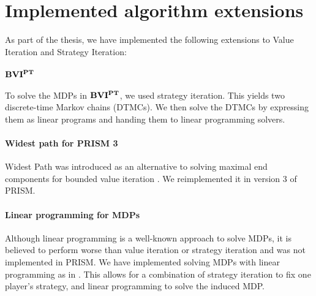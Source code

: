 \chapter{Implemented algorithm extensions} \label{ch:implementedAlgos}
As part of the thesis, we have implemented the following extensions to Value Iteration and Strategy Iteration:

\subsubsection*{$\mathbf{BVI^{PT}}$} To solve the MDPs in $\mathbf{BVI^{PT}}$, we used strategy iteration. This yields two discrete-time Markov chains (DTMCs).
We then solve the DTMCs by expressing them as linear programs and handing them to linear programming solvers.

\subsubsection*{Widest path for PRISM 3}
Widest Path was introduced as an alternative to solving maximal end components for bounded value iteration \cite{widestPath}.
We reimplemented it in version 3 of PRISM.

\subsubsection*{Linear programming for MDPs}
Although linear programming is a well-known approach to solve MDPs, it is believed to perform worse than value iteration or strategy iteration
and was not implemented in PRISM. We have implemented solving MDPs with linear programming as in \cite{Puterman}. 
This allows for a combination of strategy iteration to fix one player's strategy, and linear programming to solve the induced MDP.
